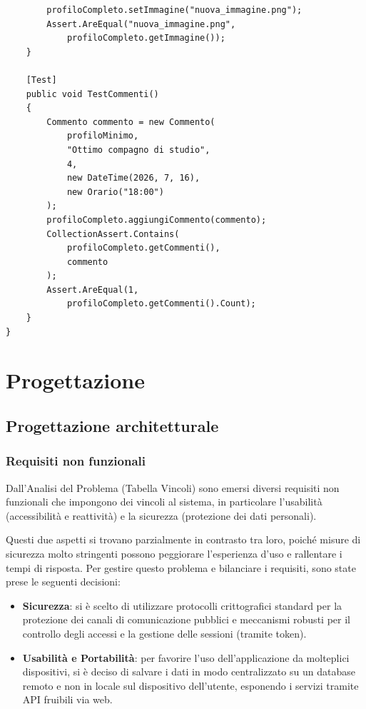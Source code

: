 \documentclass[12pt,a4paper]{report}
\begin{document}
\begin{lstlisting}
        profiloCompleto.setImmagine("nuova_immagine.png");
        Assert.AreEqual("nuova_immagine.png",
            profiloCompleto.getImmagine());
    }

    [Test]
    public void TestCommenti()
    {
        Commento commento = new Commento(
            profiloMinimo,
            "Ottimo compagno di studio",
            4,
            new DateTime(2026, 7, 16),
            new Orario("18:00")
        );
        profiloCompleto.aggiungiCommento(commento);
        CollectionAssert.Contains(
            profiloCompleto.getCommenti(),
            commento
        );
        Assert.AreEqual(1,
            profiloCompleto.getCommenti().Count);
    }
}
\end{lstlisting}

\newpage
\chapter{Progettazione}

\section{Progettazione architetturale}

\subsection{Requisiti non funzionali}
Dall'Analisi del Problema (Tabella Vincoli) sono emersi diversi requisiti non funzionali che impongono dei vincoli al sistema, in particolare l'usabilità (accessibilità e reattività) e la sicurezza (protezione dei dati personali). 

Questi due aspetti si trovano parzialmente in contrasto tra loro, poiché misure di sicurezza molto stringenti possono peggiorare l'esperienza d'uso e rallentare i tempi di risposta. Per gestire questo problema e bilanciare i requisiti, sono state prese le seguenti decisioni:
\begin{itemize}
    \item \textbf{Sicurezza}: si è scelto di utilizzare protocolli crittografici standard per la protezione dei canali di comunicazione pubblici e meccanismi robusti per il controllo degli accessi e la gestione delle sessioni (tramite token).
    \item \textbf{Usabilità e Portabilità}: per favorire l'uso dell'applicazione da molteplici dispositivi, si è deciso di salvare i dati in modo centralizzato su un database remoto e non in locale sul dispositivo dell'utente, esponendo i servizi tramite API fruibili via web.
\end{itemize}
\end{document}
